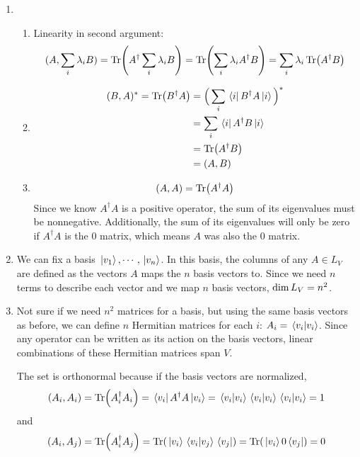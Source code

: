 \exercise
\begin{enumerate}
\item 
\begin{enumerate}[label=(\alph*)]
\item Linearity in second argument:
$$(A, \sum_{i} \lambda_{i} B) = \Tr ( A^{\dagger} \sum_{i} \lambda_{i} B ) = \Tr (\sum_{i} \lambda_{i} A^{\dagger} B) = \sum_{i} \lambda_{i} \Tr(A^{\dagger} B)$$

\item 
$$
\begin{aligned}
(B, A)^{*} = \Tr(B^{\dagger} A) &= \Big( \sum_{i} \bra*{i} B^{\dagger}A \ket*{i} \Big)^{*} \\
&= \sum_{i} \bra*{i} A^{\dagger} B \ket*{i} \\
&= \Tr(A^{\dagger} B) \\
&= (A, B)
\end{aligned}
$$

\item 
$$(A, A) = \Tr (A^{\dagger} A)$$
Since we know $A^{\dagger} A$ is a positive operator, the sum of its eigenvalues must be nonnegative. Additionally, the sum of its eigenvalues will only be zero if $A^{\dagger} A$ is the 0 matrix, which means $A$ was also the 0 matrix. 
\end{enumerate}

\item 
We can fix a basis $\ket*{v_{1}}, \cdots, \ket*{v_{n}}$. In this basis, the columns of any $A \in L_{V}$ are defined as the vectors $A$ maps the $n$ basis vectors to. Since we need $n$ terms to describe each vector and we map $n$ basis vectors, $\operatorname{dim} L_{V} = n^{2}$. 

\item Not sure if we need $n^{2}$ matrices for a basis, but using the same basis vectors as before, we can define $n$ Hermitian matrices for each $i$: $A_{i} = \bra*{v_{i}} \ket*{v_{i}}$. Since any operator can be written as its action on the basis vectors, linear combinations of these Hermitian matrices span $V$. 

The set is orthonormal because if the basis vectors are normalized, 
$$(A_{i}, A_{i}) = \Tr (A_{i}^{\dagger} A_{i}) = \bra*{v_{i}} A^{\dagger} A \ket*{v_{i}} = \bra*{v_{i}} \ket*{v_{i}} \bra*{v_{i}} \ket*{v_{i}} \bra*{v_{i}} \ket*{v_{i}} = 1$$
and 
$$(A_{i}, A_{j}) = \Tr (A_{i}^{\dagger} A_{j}) = \Tr( \ket*{v_{i}} \bra*{v_{i}} \ket*{v_{j}} \bra*{v_{j}} ) = \Tr(\ket*{v_{i}} 0 \bra*{v_{j}}) = 0$$
\end{enumerate}

